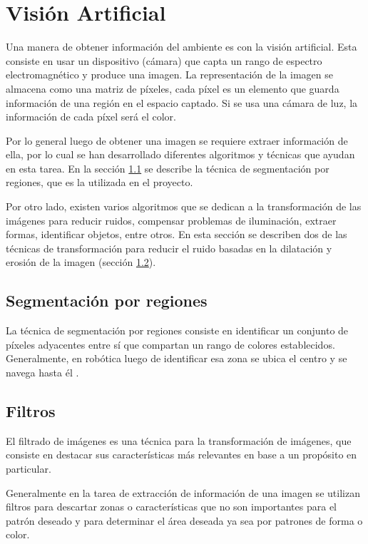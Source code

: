 \section{Visión Artificial} \label{sect:Vision_Artificial}

Una manera de obtener información del ambiente es con la visión artificial. Esta consiste en usar un dispositivo (cámara) que capta un rango de espectro electromagnético y produce una imagen. La representación de la imagen se almacena como una matriz de píxeles, cada píxel es un elemento que guarda información de una región en el espacio captado. Si se usa una cámara de luz, la información de cada píxel será el color. \cite{AiRobotics}  

Por lo general luego de obtener una imagen se requiere extraer información de ella, por lo cual se han desarrollado diferentes algoritmos y t\'ecnicas que ayudan en esta tarea. En la sección \ref{sec:Segmentacion} se describe la t\'ecnica de segmentaci\'on por regiones, que es la utilizada en el proyecto. 

Por otro lado, existen varios algoritmos que se dedican a la transformación de las imágenes para reducir
ruidos, compensar problemas de iluminación, extraer formas, identificar objetos, entre otros. En esta sección se describen dos de las técnicas de transformación para reducir el ruido basadas en la dilatación y erosión de la imagen (secci\'on \ref{sec:filtros}). 
 
\subsection{Segmentaci\'on por regiones}\label{sec:Segmentacion}

La técnica de segmentación por regiones consiste en identificar un conjunto de píxeles adyacentes entre sí que compartan un rango de colores establecidos. Generalmente, en robótica luego de identificar esa zona se ubica el centro y se navega hasta él \cite{BookOpenCv}. 

\subsection{Filtros}\label{sec:filtros}
El filtrado de imágenes es una técnica para la transformación de imágenes, que consiste en destacar  sus características más relevantes en base a un propósito en particular. 

Generalmente en la tarea de extracción de información de una imagen se utilizan filtros para descartar zonas o características que no son importantes para el patrón deseado y para determinar el área deseada ya sea por patrones de forma o color.

